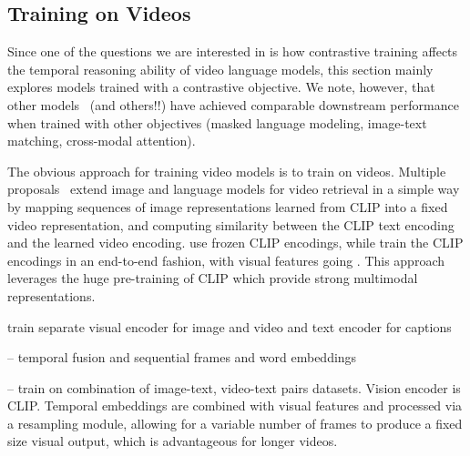 



\subsection{Training on Videos}
\label{ssec:vidtrain}


Since one of the questions we are interested in is how contrastive training
affects the temporal reasoning ability of video language models, this section
mainly explores models trained with a contrastive objective. We note, however,
that other models~\citep{lei2021clipbert} (and others!!) have achieved
comparable downstream performance when trained with other objectives (masked
language modeling, image-text matching, cross-modal attention).

The obvious approach for training video models is to train on videos. Multiple
proposals~\citep{portilloquintero2021clipvidret,luo2022clip4clip} extend image
and language models for video retrieval in a simple way by mapping sequences of
image representations learned from CLIP into a fixed video representation, and
computing similarity between the CLIP text encoding and the learned video
encoding. \citet{portilloquintero2021clipvidret} use frozen CLIP encodings, while
\citet{luo2022clip4clip} train the CLIP encodings in an end-to-end fashion, with
visual features going . This approach leverages the huge pre-training of
CLIP which provide strong multimodal representations.

\citet{bain2021frozen} train separate visual encoder for image and video and text encoder for captions

\cite{xu2021videoclip}

\cite{luo2022clip4clip}


\citet{lei2021clipbert} -- temporal fusion and sequential frames and word embeddings

\citet{alayrac2022flamingo} -- train on combination of image-text, video-text pairs datasets. Vision encoder is CLIP. Temporal embeddings are combined with visual features and processed via a resampling module, allowing for a variable number of frames to produce a fixed size visual output, which is advantageous for longer videos.

